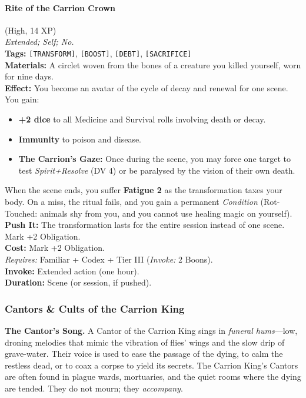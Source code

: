 \paragraph{Rite of the Carrion Crown} (High, 14 XP) \hfill \\
\emph{Extended; Self; No.} \\
\textbf{Tags:} \texttt{[TRANSFORM]}, \texttt{[BOOST]}, \texttt{[DEBT]}, \texttt{[SACRIFICE]} \\
\textbf{Materials:} A circlet woven from the bones of a creature you killed yourself, worn for nine days. \\
\textbf{Effect:} You become an avatar of the cycle of decay and renewal for one scene. You gain:
\begin{itemize}
  \item \textbf{+2 dice} to all Medicine and Survival rolls involving death or decay.
  \item \textbf{Immunity} to poison and disease.
  \item \textbf{The Carrion's Gaze:} Once during the scene, you may force one target to test \textit{Spirit+Resolve} (DV 4) or be paralysed by the vision of their own death.
\end{itemize}
When the scene ends, you suffer \textbf{Fatigue 2} as the transformation taxes your body. On a miss, the ritual fails, and you gain a permanent \textit{Condition} (Rot-Touched: animals shy from you, and you cannot use healing magic on yourself). \\
\textbf{Push It:} The transformation lasts for the entire session instead of one scene. Mark +2 Obligation. \\
\textbf{Cost:} Mark +2 Obligation. \\
\textit{Requires:} Familiar + Codex + Tier III (\textit{Invoke:} 2 Boons). \\
\textbf{Invoke:} Extended action (one hour). \\
\textbf{Duration:} Scene (or session, if pushed).

\subsubsection*{Cantors \& Cults of the Carrion King}

\textbf{The Cantor's Song.} A Cantor of the Carrion King sings in \textit{funeral hums}---low, droning melodies that mimic the vibration of flies' wings and the slow drip of grave-water. Their voice is used to ease the passage of the dying, to calm the restless dead, or to coax a corpse to yield its secrets. The Carrion King's Cantors are often found in plague wards, mortuaries, and the quiet rooms where the dying are tended. They do not mourn; they \textit{accompany}.

